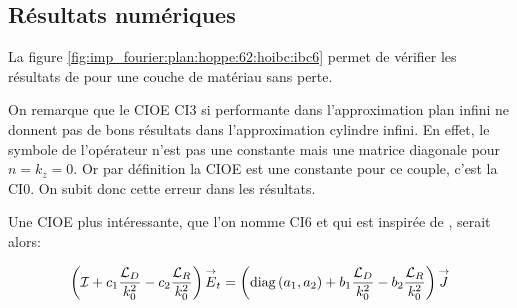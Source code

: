   \subsection{Résultats numériques}

    La figure \ref{fig:imp_fourier:plan:hoppe:62:hoibc:ibc6} permet de vérifier les résultats de \cite[p.~62]{hoppe_impedance_1995} pour une couche de matériau sans perte.


    On remarque que le CIOE CI3 si performante dans l'approximation plan infini ne donnent pas de bons résultats dans l’approximation cylindre infini. 
    En effet, le symbole de l'opérateur n'est pas une constante mais une matrice diagonale pour \(n=k_z=0\). 
    Or par définition la CIOE est une constante pour ce couple, c'est la CI0. On subit donc cette erreur dans les résultats. 

    Une CIOE plus intéressante, que l'on nomme CI6 et qui est inspirée de \cite[p.~60]{hoppe_impedance_1995}, serait alors:

    \begin{equation}
      \left({\mathcal{I}} + c_1\dfrac{{\mathcal{L}_D}}{k_0^2} -c_2\dfrac{{\mathcal{L}_R}}{k_0^2}\right){\overset{\rightarrow}{E}}_t = \left(\operatorname{diag}\left(a_1,a_2\right) + b_1\dfrac{{\mathcal{L}_D}}{k_0^2} - b_2 \dfrac{{\mathcal{L}_R}}{k_0^2} \right){\overset{\rightarrow}{J}}
    \end{equation}

